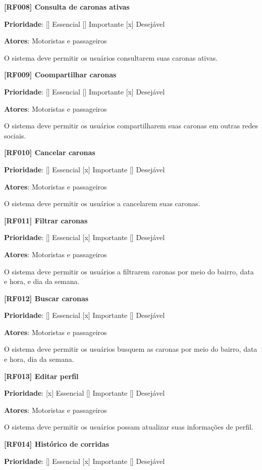 \textbf{[RF008] Consulta de caronas ativas}

\textbf{Prioridade}:      [] Essencial        [] Importante     [x] Desejável 

\textbf{Atores}: Motoristas e passageiros

O sistema deve permitir os usuários consultarem suas caronas ativas.

\textbf{[RF009] Coompartilhar caronas}

\textbf{Prioridade}:      [] Essencial        [] Importante     [x] Desejável 

\textbf{Atores}: Motoristas e passageiros

O sistema deve permitir os usuários compartilharem suas caronas em outras redes sociais.

\textbf{[RF010] Cancelar caronas}

\textbf{Prioridade}:      [] Essencial        [x] Importante     [] Desejável 

\textbf{Atores}: Motoristas e passageiros

O sistema deve permitir os usuários a cancelarem suas caronas.


\textbf{[RF011] Filtrar caronas}

\textbf{Prioridade}:      [] Essencial        [x] Importante     [] Desejável 

\textbf{Atores}: Motoristas e passageiros

O sistema deve permitir os usuários a filtrarem caronas por meio do bairro, data e hora, e dia da semana.

\textbf{[RF012] Buscar caronas}

\textbf{Prioridade}:      [] Essencial        [x] Importante     [] Desejável 

\textbf{Atores}: Motoristas e passageiros

O sistema deve permitir os usuários busquem as caronas por meio do bairro, data e hora, dia da semana.

\textbf{[RF013] Editar perfil}

\textbf{Prioridade}:      [x] Essencial        [] Importante     [] Desejável 

\textbf{Atores}: Motoristas e passageiros

O sistema deve permitir os usuários possam atualizar suas informações de perfil.

\textbf{[RF014] Histórico de corridas}

\textbf{Prioridade}:      [] Essencial        [x] Importante     [] Desejável 

